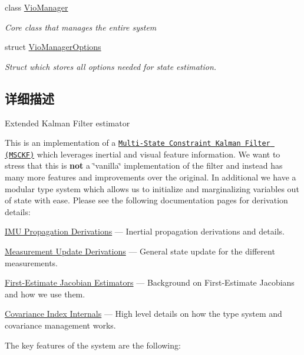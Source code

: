 \begin{DoxyCompactItemize}
class \hyperlink{classov__msckf_1_1VioManager}{Vio\+Manager}
\begin{DoxyCompactList}\small\item\em Core class that manages the entire system \end{DoxyCompactList}\item 
struct \hyperlink{structov__msckf_1_1VioManagerOptions}{Vio\+Manager\+Options}
\begin{DoxyCompactList}\small\item\em Struct which stores all options needed for state estimation. \end{DoxyCompactList}\end{DoxyCompactItemize}


\subsection{详细描述}
Extended Kalman Filter estimator 

This is an implementation of a \href{https://ieeexplore.ieee.org/document/4209642}{\tt Multi-\/\+State Constraint Kalman Filter (M\+S\+C\+KF)} \cite{Mourikis2007ICRA} which leverages inertial and visual feature information. We want to stress that this is {\bfseries not} a \char`\"{}vanilla\char`\"{} implementation of the filter and instead has many more features and improvements over the original. In additional we have a modular type system which allows us to initialize and marginalizing variables out of state with ease. Please see the following documentation pages for derivation details\+:


\begin{DoxyItemize}
\item \hyperlink{propagation}{I\+MU Propagation Derivations} --- Inertial propagation derivations and details.
\item \hyperlink{update}{Measurement Update Derivations} --- General state update for the different measurements.
\item \hyperlink{fej}{First-\/\+Estimate Jacobian Estimators} --- Background on First-\/\+Estimate Jacobians and how we use them.
\item \hyperlink{dev-index}{Covariance Index Internals} --- High level details on how the type system and covariance management works.
\end{DoxyItemize}

The key features of the system are the following\+:



